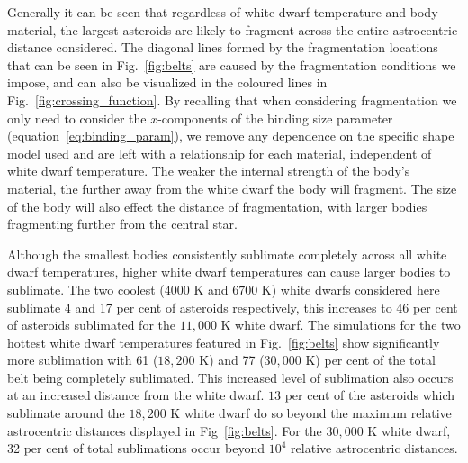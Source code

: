 \documentclass[fleqn,usenatbib]{mnras}
\begin{document}
Generally it can be seen that regardless of white dwarf temperature and body material, the largest asteroids are likely to fragment across the entire astrocentric distance considered. 
The diagonal lines formed by the fragmentation locations that can be seen in Fig.~\ref{fig:belts} are caused by the fragmentation conditions we impose, and can also be visualized in the coloured lines in Fig.~\ref{fig:crossing_function}.
By recalling that when considering fragmentation we only need to consider the $x$-components of the binding size parameter (equation~\ref{eq:binding_param}), we remove any dependence on the specific shape model used and are left with a relationship for each material, independent of white dwarf temperature.
The weaker the internal strength of the body's material, the further away from the white dwarf the body will fragment. 
The size of the body will also effect the distance of fragmentation, with larger bodies fragmenting further from the central star. 

Although the smallest bodies consistently sublimate completely across all white dwarf temperatures, higher white dwarf temperatures can cause larger bodies to sublimate. 
The two coolest ($4000$ K and $6700$ K) white dwarfs considered here sublimate 4 and 17 per cent of asteroids respectively, this increases to 46 per cent of asteroids sublimated for the $11,000$ K white dwarf. 
The simulations for the two hottest white dwarf temperatures featured in Fig.~\ref{fig:belts} show significantly more sublimation with 61 ($18,200$ K) and 77 ($30,000$ K) per cent of the total belt being completely sublimated. 
This increased level of sublimation also occurs at an increased distance from the white dwarf.
$13$ per cent of the asteroids which sublimate around the $18,200$ K white dwarf do so beyond the maximum relative astrocentric distances displayed in Fig~\ref{fig:belts}.
For the $30,000$ K white dwarf, 32 per cent of total sublimations occur beyond $10^4$ relative astrocentric distances. 
\end{document}
